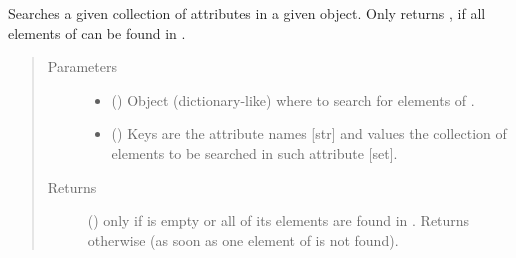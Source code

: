 \documentclass[letterpaper,10pt,english]{sphinxmanual}
\begin{document}
\begin{fulllineitems}
\begin{fulllineitems}
\end{fulllineitems}


\begin{fulllineitems}
\label{\detokenize{reference:pypath.main.PyPath.search_attr_and}}
Searches a given collection of attributes in a given object.
Only returns , if all elements of  can be found in
.
\begin{quote}\begin{description}
\item[{Parameters}] \leavevmode\begin{itemize}
\item {} 
 () \textendash{} Object (dictionary-like) where to search for elements of
.

\item {} 
 () \textendash{} Keys are the attribute names {[}str{]} and values the collection
of elements to be searched in such attribute {[}set{]}.

\end{itemize}

\item[{Returns}] \leavevmode
() \textendash{}  only if  is empty or all of its
elements are found in . Returns  otherwise (as
soon as one element of  is not found).

\end{description}\end{quote}

\end{fulllineitems}



\end{fulllineitems}
\end{document}
